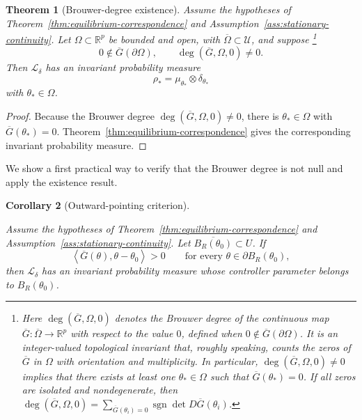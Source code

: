 \documentclass[11pt]{article}
\newtheorem{theorem}{Theorem}[section]
\newtheorem{corollary}[theorem]{Corollary}
\theoremstyle{definition}
\theoremstyle{remark}
\newcommand{\STO}{\mathcal{L}}
\newcommand{\R}{\mathbb{R}}
\begin{document}
\begin{theorem}[Brouwer-degree existence]
\label{thm:degree-existence}
Assume the hypotheses of Theorem~\ref{thm:equilibrium-correspondence} and
Assumption~\ref{ass:stationary-continuity}.  Let
\(\Omega\subset\R^p\) be bounded and open, with
\(\overline\Omega\subset\mathcal U\), and suppose
\footnote{Here $\deg(\overline G,\Omega,0)$ denotes the Brouwer degree of the
continuous map $\overline G:\overline\Omega\to\mathbb R^p$ with respect to
the value $0$, defined when $0\notin\overline G(\partial\Omega)$.  It is an
integer-valued topological invariant that, roughly speaking, counts the zeros
of $\overline G$ in $\Omega$ with orientation and multiplicity.  In
particular, $\deg(\overline G,\Omega,0)\neq0$ implies that there exists at
least one $\theta_*\in\Omega$ such that $\overline G(\theta_*)=0$.  If all
zeros are isolated and nondegenerate, then
$\deg(\overline G,\Omega,0)=
\sum_{\overline G(\theta_i)=0}\operatorname{sgn}\det
D\overline G(\theta_i)$.}
\[
  0\notin\overline G(\partial\Omega),
  \qquad
  \deg(\overline G,\Omega,0)\neq0.
  \label{eq:nonzero-degree}
\]
Then \(\STO_\delta\) has an invariant probability measure
\[
  \rho_*=\mu_{\theta_*}\otimes\delta_{\theta_*}
\]
with \(\theta_*\in\Omega\).
\end{theorem}

\begin{proof}
Because the Brouwer degree $  \deg(\overline G,\Omega,0)\neq0$, there is
\(\theta_*\in\Omega\) with \(\overline G(\theta_*)=0\).
Theorem~\ref{thm:equilibrium-correspondence} gives the corresponding invariant
probability measure.
\end{proof}

We show a first practical way to verify that the Brouwer degree is not null and apply the existence result.

\begin{corollary}[Outward-pointing criterion]
\label{cor:outward-pointing-existence}


Assume the hypotheses of Theorem~\ref{thm:equilibrium-correspondence}
and Assumption~\ref{ass:stationary-continuity}.
Let $\overline{B_R(\theta_0)}\subset U$.
  If
\begin{equation}
  \left\langle\overline G(\theta),\theta-\theta_0\right\rangle>0
  \qquad
  \text{for every }\theta\in\partial B_R(\theta_0),
  \label{eq:outward-pointing-condition}
\end{equation}
then \(\STO_\delta\) has an invariant probability measure whose controller
parameter belongs to \(B_R(\theta_0)\).
\end{corollary}
\end{document}
